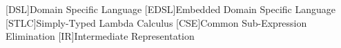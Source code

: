 [DSL]{Domain Specific Language}
[EDSL]{Embedded Domain Specific Language}
[STLC]{Simply-Typed Lambda Calculus}
[CSE]{Common Sub-Expression Elimination}
[IR]{Intermediate Representation}


\newcommand{\jfdm}[1]{\chcomment[id=jfdm]{#1}}
\newcommand{\gallais}[1]{\chcomment[id=gallais]{#1}}

\newcommand{\Velo}{V{\'e}lo\xspace}
\newcommand{\Idris}{Idris~2}



